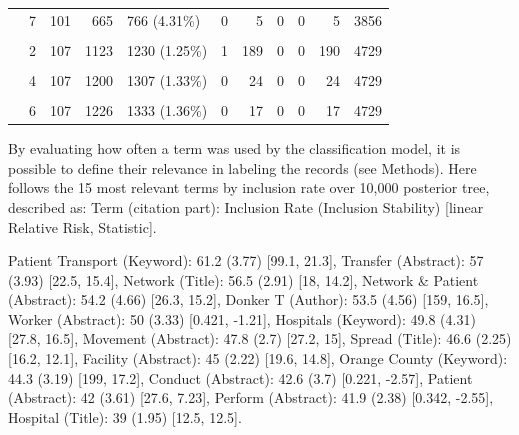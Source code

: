 \documentclass{article}
\begin{document}
\begin{table}[!h]
{\begin{tabular}[t]{llrrlrrrrrr}
 & 7 & 101 & 665 & 766 (4.31\%) & 0 & 5 & 0 & 0 & 5 & 3856\\
\cellcolor{gray!6}{Session2 (n = 98371)} & \cellcolor{gray!6}{1} & \cellcolor{gray!6}{106} & \cellcolor{gray!6}{934} & \cellcolor{gray!6}{1040 (1.06\%)} & \cellcolor{gray!6}{5} & \cellcolor{gray!6}{270} & \cellcolor{gray!6}{998} & \cellcolor{gray!6}{0} & \cellcolor{gray!6}{1273} & \cellcolor{gray!6}{4729}\\
 & 2 & 107 & 1123 & 1230 (1.25\%) & 1 & 189 & 0 & 0 & 190 & 4729\\
\addlinespace
\cellcolor{gray!6}{} & \cellcolor{gray!6}{3} & \cellcolor{gray!6}{107} & \cellcolor{gray!6}{1176} & \cellcolor{gray!6}{1283 (1.3\%)} & \cellcolor{gray!6}{0} & \cellcolor{gray!6}{53} & \cellcolor{gray!6}{0} & \cellcolor{gray!6}{0} & \cellcolor{gray!6}{53} & \cellcolor{gray!6}{4733}\\
 & 4 & 107 & 1200 & 1307 (1.33\%) & 0 & 24 & 0 & 0 & 24 & 4729\\
\cellcolor{gray!6}{} & \cellcolor{gray!6}{5} & \cellcolor{gray!6}{107} & \cellcolor{gray!6}{1209} & \cellcolor{gray!6}{1316 (1.34\%)} & \cellcolor{gray!6}{0} & \cellcolor{gray!6}{9} & \cellcolor{gray!6}{0} & \cellcolor{gray!6}{0} & \cellcolor{gray!6}{9} & \cellcolor{gray!6}{4729}\\
 & 6 & 107 & 1226 & 1333 (1.36\%) & 0 & 17 & 0 & 0 & 17 & 4729\\
\bottomrule
\end{tabular}}
\end{table}

By evaluating how often a term was used by the classification model, it
is possible to define their relevance in labeling the records (see
Methods). Here follows the 15 most relevant terms by inclusion rate over
10,000 posterior tree, described as: Term (citation part): Inclusion
Rate (Inclusion Stability) {[}linear Relative Risk, Statistic{]}.

Patient Transport (Keyword): 61.2 (3.77) {[}99.1, 21.3{]}, Transfer
(Abstract): 57 (3.93) {[}22.5, 15.4{]}, Network (Title): 56.5 (2.91)
{[}18, 14.2{]}, Network \& Patient (Abstract): 54.2 (4.66) {[}26.3,
15.2{]}, Donker T (Author): 53.5 (4.56) {[}159, 16.5{]}, Worker
(Abstract): 50 (3.33) {[}0.421, -1.21{]}, Hospitals (Keyword): 49.8
(4.31) {[}27.8, 16.5{]}, Movement (Abstract): 47.8 (2.7) {[}27.2, 15{]},
Spread (Title): 46.6 (2.25) {[}16.2, 12.1{]}, Facility (Abstract): 45
(2.22) {[}19.6, 14.8{]}, Orange County (Keyword): 44.3 (3.19) {[}199,
17.2{]}, Conduct (Abstract): 42.6 (3.7) {[}0.221, -2.57{]}, Patient
(Abstract): 42 (3.61) {[}27.6, 7.23{]}, Perform (Abstract): 41.9 (2.38)
{[}0.342, -2.55{]}, Hospital (Title): 39 (1.95) {[}12.5, 12.5{]}.
\end{document}
